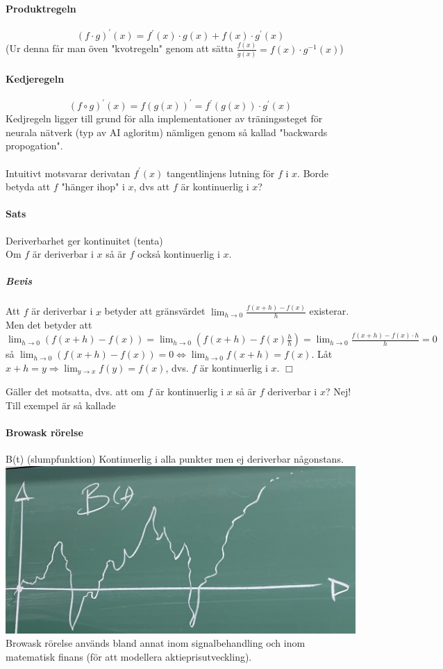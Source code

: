 \paragraph{Produktregeln}
\begin{equation*}
    (f\cdot g)^\prime(x)=f^\prime(x)\cdot g(x)+f(x)\cdot g^\prime(x)
\end{equation*}
(Ur denna får man öven "kvotregeln" genom att sätta $\frac{f(x)}{g(x)}=f(x)\cdot g^{-1}(x)$)

\paragraph{Kedjeregeln}
\begin{equation*}
    (f\circ g)^\prime(x)=
    f(g(x))^\prime=
    f^\prime(g(x))\cdot g^\prime(x)
\end{equation*}
Kedjregeln ligger till grund för alla implementationer av träningssteget för neurala nätverk
(typ av AI agloritm) nämligen genom så kallad "backwards propogation".
\\\\
Intuitivt motsvarar derivatan $f^\prime(x)$ tangentlinjens lutning för $f$ i $x$.
Borde betyda att $f$ "hänger ihop" i $x$, dvs att $f$ är kontinuerlig i $x$?

\paragraph{Sats} Deriverbarhet ger kontinuitet (tenta)\\
Om $f$ är deriverbar i $x$ så är $f$ också kontinuerlig i $x$.
\subparagraph{Bevis} Att $f$ är deriverbar i $x$ betyder att gränsvärdet
$\lim_{h\to 0}\frac{f(x+h)-f(x)}{h}$ existerar.
Men det betyder att $\lim_{h\to 0}(f(x+h)-f(x))=\lim_{h\to 0}(f(x+h)-f(x)\frac{h}{h})=\lim_{h\to 0}\frac{f(x+h)-f(x)\cdot h}{h}=0$
så $\lim_{h\to 0}(f(x+h)-f(x))=0\Leftrightarrow\lim_{h\to 0}f(x+h)=f(x)$.
Låt $x+h=y\Rightarrow\lim_{y\to x}f(y)=f(x)$, dvs. $f$ är kontinuerlig i $x$. $\Box$

Gäller det motsatta, dvs. att om $f$ är kontinuerlig i $x$ så är $f$ deriverbar i $x$?
Nej! Till exempel är så kallade
\paragraph{Browask rörelse} B(t) (slumpfunktion)
Kontinuerlig i alla punkter men ej deriverbar någonstans.
\includegraphics[scale=0.2]{lessons/lesson06/imgs/img04.jpg}\\
Browask rörelse används bland annat inom signalbehandling och inom
matematisk finans (för att modellera aktieprisutveckling).

